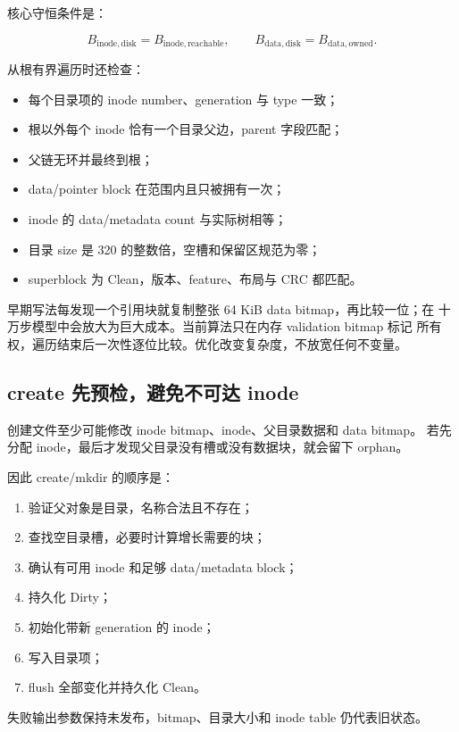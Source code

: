 核心守恒条件是：

\[
  B_{\mathrm{inode,disk}}=B_{\mathrm{inode,reachable}},
  \qquad
  B_{\mathrm{data,disk}}=B_{\mathrm{data,owned}}.
\]

从根有界遍历时还检查：

\begin{itemize}
  \item 每个目录项的 inode number、generation 与 type 一致；
  \item 根以外每个 inode 恰有一个目录父边，parent 字段匹配；
  \item 父链无环并最终到根；
  \item data/pointer block 在范围内且只被拥有一次；
  \item inode 的 data/metadata count 与实际树相等；
  \item 目录 size 是 320 的整数倍，空槽和保留区规范为零；
  \item superblock 为 Clean，版本、feature、布局与 CRC 都匹配。
\end{itemize}

早期写法每发现一个引用块就复制整张 64 KiB data bitmap，再比较一位；在
十万步模型中会放大为巨大成本。当前算法只在内存 validation bitmap 标记
所有权，遍历结束后一次性逐位比较。优化改变复杂度，不放宽任何不变量。

\subsection{create 先预检，避免不可达 inode}

创建文件至少可能修改 inode bitmap、inode、父目录数据和 data bitmap。
若先分配 inode，最后才发现父目录没有槽或没有数据块，就会留下 orphan。

因此 create/mkdir 的顺序是：

\begin{enumerate}
  \item 验证父对象是目录，名称合法且不存在；
  \item 查找空目录槽，必要时计算增长需要的块；
  \item 确认有可用 inode 和足够 data/metadata block；
  \item 持久化 Dirty；
  \item 初始化带新 generation 的 inode；
  \item 写入目录项；
  \item flush 全部变化并持久化 Clean。
\end{enumerate}

失败输出参数保持未发布，bitmap、目录大小和 inode table 仍代表旧状态。


